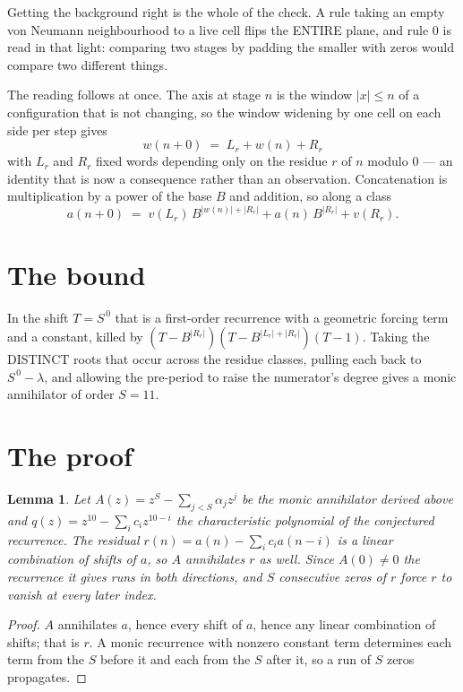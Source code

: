 \documentclass[11pt,a4paper]{article}
\theoremstyle{plain}
\newtheorem{lemma}[theorem]{Lemma}
\theoremstyle{definition}
\begin{document}
Getting the background right is the whole of the check. A rule taking an empty von Neumann
neighbourhood to a live cell flips the ENTIRE plane, and rule 0 is read
in that light: comparing two stages by padding the smaller with zeros would compare two
different things.

The reading follows at once. The axis at stage $n$ is the window $|x|\le n$ of a configuration
that is not changing, so the window widening by one cell on each side per step gives
\[
w(n+0)\;=\;L_r + w(n) + R_r
\]
with $L_r$ and $R_r$ fixed words depending only on the residue $r$ of $n$ modulo $0$ --- an
identity that is now a consequence rather than an observation. Concatenation is multiplication
by a power of the base $B$ and addition, so along a class
\[
a(n+0)\;=\;v(L_r)\,B^{|w(n)|+|R_r|} + a(n)\,B^{|R_r|} + v(R_r).
\]

\section{The bound}

In the shift $T=S^{\,0}$ that is a first-order recurrence with a geometric forcing term and a
constant, killed by $(T-B^{|R_r|})(T-B^{|L_r|+|R_r|})(T-1)$. Taking the DISTINCT roots that
occur across the residue classes, pulling each back to $S^{\,0}-\lambda$, and allowing the
pre-period to raise the numerator's degree gives a monic annihilator of order $S=11$.

\section{The proof}

\begin{lemma}\label{lem:crit}
Let $A(z)=z^S-\sum_{j<S}\alpha_jz^{j}$ be the monic annihilator derived above and
$q(z)=z^{10}-\sum_ic_iz^{10-i}$ the characteristic polynomial of the conjectured
recurrence. The residual $r(n)=a(n)-\sum_ic_ia(n-i)$ is a linear combination of shifts of $a$,
so $A$ annihilates $r$ as well. Since $A(0)\ne0$ the recurrence it gives runs in both
directions, and $S$ consecutive zeros of $r$ force $r$ to vanish at every later index.
\end{lemma}

\begin{proof}
$A$ annihilates $a$, hence every shift of $a$, hence any linear combination of shifts; that is
$r$. A monic recurrence with nonzero constant term determines each term from the $S$ before it
and each from the $S$ after it, so a run of $S$ zeros propagates.
\end{proof}
\end{document}

